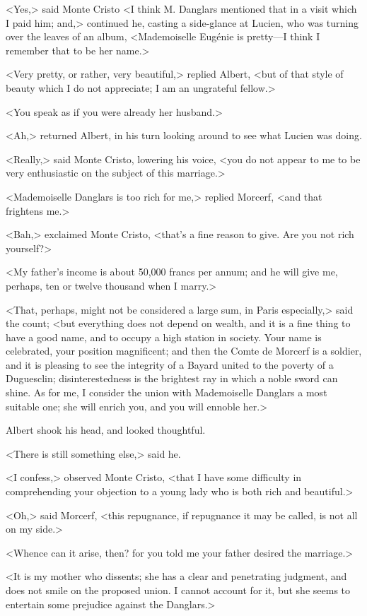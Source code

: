  <Yes,> said Monte Cristo <I think M. Danglars mentioned that in a visit which I paid him; and,> continued he, casting a side-glance at Lucien, who was turning over the leaves of an album, <Mademoiselle Eugénie is pretty—I think I remember that to be her name.> 

 <Very pretty, or rather, very beautiful,> replied Albert, <but of that style of beauty which I do not appreciate; I am an ungrateful fellow.> 

 <You speak as if you were already her husband.> 

 <Ah,> returned Albert, in his turn looking around to see what Lucien was doing. 

 <Really,> said Monte Cristo, lowering his voice, <you do not appear to me to be very enthusiastic on the subject of this marriage.> 

 <Mademoiselle Danglars is too rich for me,> replied Morcerf, <and that frightens me.> 

 <Bah,> exclaimed Monte Cristo, <that's a fine reason to give. Are you not rich yourself?> 

 <My father's income is about 50,000 francs per annum; and he will give me, perhaps, ten or twelve thousand when I marry.> 

 <That, perhaps, might not be considered a large sum, in Paris especially,> said the count; <but everything does not depend on wealth, and it is a fine thing to have a good name, and to occupy a high station in society. Your name is celebrated, your position magnificent; and then the Comte de Morcerf is a soldier, and it is pleasing to see the integrity of a Bayard united to the poverty of a Duguesclin; disinterestedness is the brightest ray in which a noble sword can shine. As for me, I consider the union with Mademoiselle Danglars a most suitable one; she will enrich you, and you will ennoble her.> 

 Albert shook his head, and looked thoughtful. 

 <There is still something else,> said he. 

 <I confess,> observed Monte Cristo, <that I have some difficulty in comprehending your objection to a young lady who is both rich and beautiful.> 

 <Oh,> said Morcerf, <this repugnance, if repugnance it may be called, is not all on my side.> 

 <Whence can it arise, then? for you told me your father desired the marriage.> 

 <It is my mother who dissents; she has a clear and penetrating judgment, and does not smile on the proposed union. I cannot account for it, but she seems to entertain some prejudice against the Danglars.>  
 
